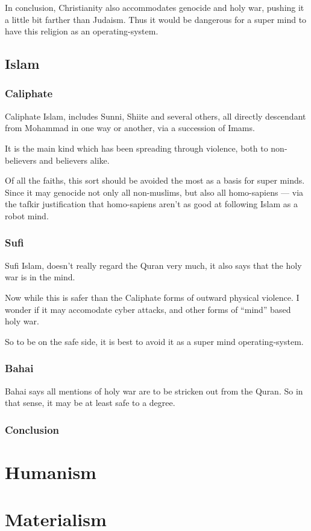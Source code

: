 In conclusion, Christianity also accommodates genocide and holy war,  pushing it
a little bit farther than Judaism. Thus it would be dangerous for a super mind
to have this religion as an operating-system. 

\section{Islam}
\subsection{Caliphate}
Caliphate Islam, includes Sunni, Shiite and several others,  all directly
descendant from Mohammad in one way or another, via a succession of Imams. 

It is the main kind which has been spreading through violence, both to
non-believers and believers alike. 

Of all the faiths, this sort should be avoided the most as a basis for super
minds.  Since it may genocide not only all non-muslims, but also all
homo-sapiens --- via the tafkir justification that homo-sapiens aren't as good at
following Islam as a robot mind. 

\subsection{Sufi}

Sufi Islam, doesn't really regard the Quran very much,
it also says that the holy war is in the mind. 

Now while this is safer than the Caliphate forms of outward physical violence. 
I wonder if it may accomodate cyber attacks, and other forms of ``mind'' based
holy war. 

So to be on the safe side, it is best to avoid it as a super mind
operating-system.

\subsection{Bahai}

Bahai says all mentions of holy war are to be stricken out from the Quran. 
So in that sense, it may be at least safe to a degree.
\subsection{Conclusion}
\chapter{Humanism}
\chapter{Materialism}
